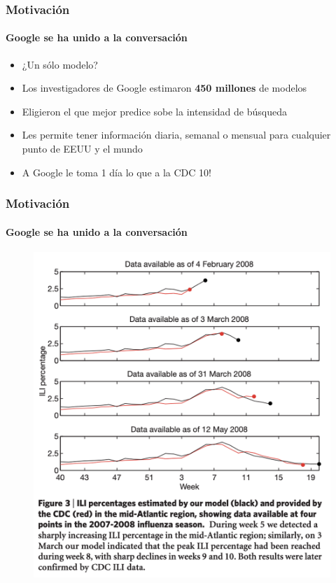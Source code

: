 \documentclass[
  shownotes,
  xcolor={svgnames},
  hyperref={colorlinks,citecolor=DarkBlue,linkcolor=DarkRed,urlcolor=DarkBlue}
  , aspectratio=169]{beamer}
\begin{document}
\begin{frame}
\frametitle{Motivación}
\framesubtitle{Google se ha unido a la conversación}

\begin{itemize}
  \item ¿Un sólo modelo?
  \pause
  \bigskip
  \item Los investigadores de Google estimaron {\bf 450 millones} de modelos
  \bigskip
  \item Eligieron el que mejor predice sobe la intensidad de búsqueda
  \bigskip
  \item Les permite tener información diaria, semanal o mensual para cualquier punto de EEUU y el mundo
  \bigskip
  \item A Google le toma 1 día lo que a la CDC 10!
\end{itemize}  
\end{frame}
\begin{frame}
\frametitle{Motivación}
\framesubtitle{Google se ha unido a la conversación}
\begin{figure}[H] \centering
            \captionsetup{justification=centering}  
            \includegraphics[scale=0.45]{figures/flu_trends}
    \end{figure}
\end{frame}
\end{document}
